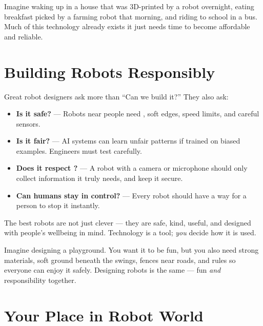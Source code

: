 \begin{picturethis}
  Imagine waking up in a house that was 3D-printed by a robot overnight,
  eating breakfast picked by a farming robot that morning, and riding
  to school in a  bus. Much of this technology already exists
  \textemdash{} it just needs time to become affordable and reliable.
\end{picturethis}

\sectionrule


\section*{Building Robots Responsibly}

Great robot designers ask more than ``Can we build it?'' They also ask:

\begin{itemize}
  \item \textbf{Is it safe?} --- Robots near people need , soft edges,
    speed limits, and careful sensors.
  \item \textbf{Is it fair?} --- AI systems can learn unfair patterns if trained
    on biased examples. Engineers must test carefully.
  \item \textbf{Does it respect ?} --- A robot with a camera or microphone
    should only collect information it truly needs, and keep it secure.
  \item \textbf{Can humans stay in control?} --- Every robot should have a way for
    a person to stop it instantly.
\end{itemize}

\begin{bigidea}
  The best robots are not just clever --- they are safe, kind, useful,
  and designed with people's wellbeing in mind.
  Technology is a tool; \emph{you} decide how it is used.
\end{bigidea}

\begin{picturethis}
  Imagine designing a playground. You want it to be fun, but you also need
  strong materials, soft ground beneath the swings, fences near roads,
  and rules so everyone can enjoy it safely.
  Designing robots is the same --- fun \emph{and} responsibility together.
\end{picturethis}

\sectionrule

\section*{Your Place in Robot World}

